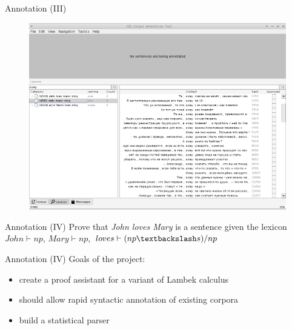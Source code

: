 \documentclass{beamer}
\begin{document}
\begin{frame}{Annotation (III)}
\begin{center}
	\begin{figure}[H]
		\includegraphics[scale=0.285]{annotation2.png} 
	\end{figure}
\end{center}
\end{frame}

\begin{frame}{Annotation (IV)}
Prove that \textit{John loves Mary} is a sentence given the lexicon\\
\medskip
$John \vdash np$, $Mary \vdash np$, $loves \vdash (np \textbackslash s)/np$

\begin{prooftree}
\end{prooftree}
\end{frame}

\begin{frame}{Annotation (IV)}
Goals of the project:\\
\bigskip
\begin{itemize}
    \item create a proof assistant for a variant of Lambek calculus
    \item should allow rapid syntactic annotation of existing corpora
    \item build a statistical parser
\end{itemize}
\end{frame}
\end{document}
